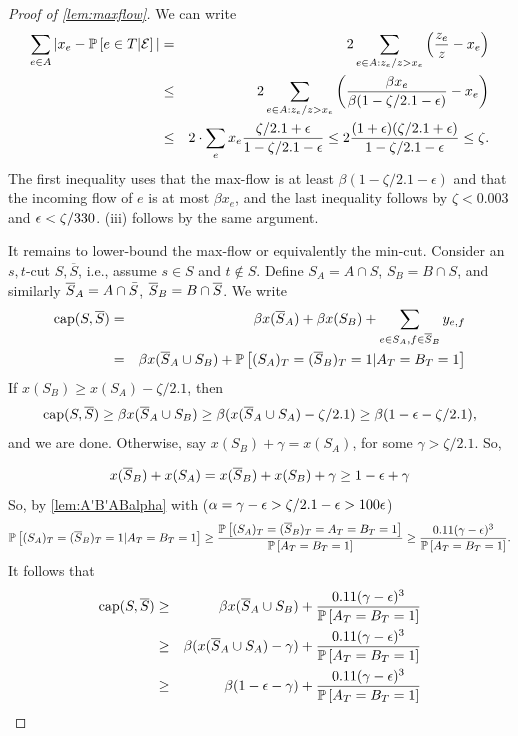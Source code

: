 \begin{proof}[Proof of \cref{lem:maxflow}]
		We can write
		\begin{eqnarray*}\sum_{e\in A} |x_e-{\mathbb{P}}\left[e\in T | {\cal E}\right]|&=&2\sum_{e\in A: z_e/z>x_e} \left(\frac{z_e}{z} -x_e \right)\\
		&\leq& 2\sum_{e\in A: z_e/z > x_e} \left(\frac{\beta x_e}{\beta(1-\zeta/2.1-{\epsilon})} - x_e\right) \\
		&\leq& 2 \cdot \sum_e x_e \frac{\zeta/2.1+{\epsilon}}{1-\zeta/2.1-{\epsilon}}\leq 2\frac{(1+{\epsilon})(\zeta/2.1+ {\epsilon})}{1-\zeta/2.1- {\epsilon}} \le  \zeta.	
		\end{eqnarray*}
		The first inequality uses that the max-flow is at least $\beta(1-\zeta/2.1-\epsilon)$ and that the incoming flow of $e$ is at most $\beta x_e$, and the last inequality follows by $\zeta<0.003$ and ${\epsilon}<\zeta/330$.
		(iii) follows by the same argument.
	
	
	It remains to lower-bound the max-flow or equivalently the min-cut.
	Consider an $s,t$-cut $S,\overline{S}$, i.e., assume $s\in S$ and $t\notin S$. Define $S_A=A\cap S$, $S_B=B\cap S$, and similarly ${\overline{S}}_A = A \cap \bar{S}$, ${\overline{S}}_B = B \cap \overline{S}$. We write
	\begin{eqnarray*}
		\text{cap}(S,{\overline{S}}) &=& \beta x({\overline{S}}_A) + \beta x(S_B) + \sum_{e\in S_A, f\in {\overline{S}}_B} y_{e,f}\\
		&= & \beta x({\overline{S}}_A\cup S_B) + {\mathbb{P}}\left[(S_A)_T=({\overline{S}}_B)_T=1 | A_T=B_T=1\right]
	\end{eqnarray*}
	If $x(S_B)\geq x(S_A)-\zeta/2.1$, then 
	$$\text{cap}(S,{\overline{S}}) \geq \beta x({\overline{S}}_A\cup S_B)\geq \beta(x({\overline{S}}_A\cup S_A)-\zeta/2.1) \geq \beta (1-{\epsilon}-\zeta/2.1),$$
    and we are done.
	Otherwise, say $x(S_B) +\gamma= x(S_A)$, for some $\gamma>\zeta/2.1$. So, 
	
    $$x({\overline{S}}_B) + x(S_A) = x({\overline{S}}_B) + x(S_B)+\gamma \geq 1-{\epsilon}+\gamma$$
	So, by \cref{lem:A'B'ABalpha} with ($\alpha = \gamma-{\epsilon} > \zeta/2.1 - {\epsilon} > 100{\epsilon}$) %
	$${\mathbb{P}}\left[(S_A)_T=({\overline{S}}_B)_T=1 | A_T=B_T=1\right] \geq \frac{{\mathbb{P}}\left[(S_A)_T=({\overline{S}}_B)_T=A_T=B_T=1\right]}{ {\mathbb{P}}\left[A_T=B_T=1\right]}\geq \frac{0.11(\gamma-{\epsilon})^3}{{\mathbb{P}}\left[A_T=B_T=1\right]}.$$
	It follows that 
	\begin{eqnarray*}\text{cap}(S,{\overline{S}}) &\geq& \beta x({\overline{S}}_A\cup S_B) +\frac{0.11(\gamma-{\epsilon})^3}{{\mathbb{P}}\left[A_T=B_T=1\right]}\\
	&\geq &	 \beta (x({\overline{S}}_A \cup S_A) - \gamma)+\frac{0.11(\gamma-{\epsilon})^3}{{\mathbb{P}}\left[A_T=B_T=1\right]}\\
	&\geq & \beta(1-{\epsilon}-\gamma)+\frac{0.11(\gamma-{\epsilon})^3}{{\mathbb{P}}\left[A_T=B_T=1\right]}
	\end{eqnarray*}


\end{proof}
